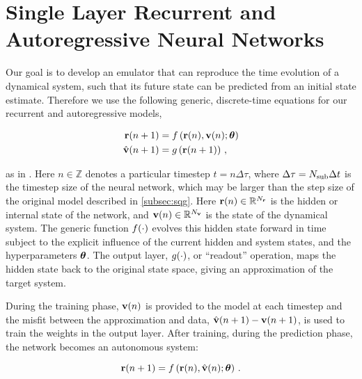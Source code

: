 \section{Single Layer Recurrent and Autoregressive Neural Networks}
\label{sec:rnn-architecture}

Our goal is to develop an emulator that can reproduce the time evolution of a
dynamical system, such that its future state can be predicted from an initial
state estimate.
Therefore we use the following generic, discrete-time equations for our
recurrent and autoregressive models,
\begin{linenomath*}\begin{equation}
    \begin{aligned}
        \mathbf{r}(n+1) &= f\left(
            \mathbf{r}(n), \mathbf{v}(n); \bm{\theta}
            \right) \\
        \hat{\mathbf{v}}(n+1) &= g \left( \mathbf{r}(n+1) \right) \, ,
    \end{aligned}
    \label{eq:rnn}
\end{equation}\end{linenomath*}
as in \citet{goodfellow_sequence_2016}.
Here $n\in\mathbb{Z}$ denotes a particular timestep $t = n\Delta \tau$,
where $\Delta\tau = N_\text{sub}\Delta t$ is the timestep size of the neural network,
which may be larger than the step size of the original model described in
\cref{subsec:sqg}.
Here
$\mathbf{r}(n)\in\mathbb{R}^{N_{\mathbf{r}}}$ is the hidden or internal state of the network,
and
$\mathbf{v}(n)\in\mathbb{R}^{N_{\mathbf{v}}}$ is the state of the dynamical system.
The generic function $f(\cdot)$ evolves this hidden state forward in
time subject to the explicit
influence of the current hidden and system states, and the hyperparameters
$\bm{\theta}$.
The output layer,
$g(\cdot)$, or ``readout'' operation,
maps the hidden state back to the original state space, giving an
approximation of the target system.

During the training phase, $\mathbf{v}(n)$ is provided to the model at each timestep
and the misfit between the approximation and data,
$\hat{\mathbf{v}}(n+1) - \mathbf{v}(n+1)$, is used to train the weights in the output
layer.
After training, during the prediction phase, the network becomes an autonomous
system:
\begin{linenomath*}\begin{equation*}
    \mathbf{r}(n+1) = f\left(
        \mathbf{r}(n), \hat{\mathbf{v}}(n); \bm{\theta}\right) \, .
\end{equation*}\end{linenomath*}


